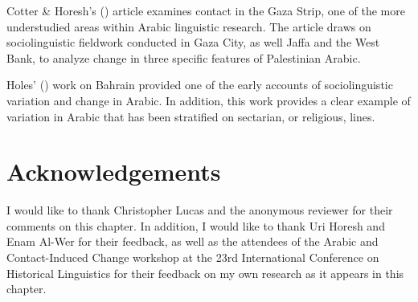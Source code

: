 \documentclass[output=paper]{langsci/langscibook}
\begin{document}
Cotter \& Horesh’s (\citeyear{CotterHoresh2015}) article examines contact in the Gaza Strip, one of the more understudied areas within Arabic linguistic research. The article draws on sociolinguistic fieldwork conducted in Gaza City, as well Jaffa and the West Bank, to analyze change in three specific features of Palestinian Arabic.

Holes' (\citeyear{Holes1987}) work on Bahrain provided one of the early accounts of sociolinguistic variation and change in Arabic. In addition, this work provides a clear example of variation in Arabic that has been stratified on sectarian, or religious, lines. 

\section*{Acknowledgements}

I would like to thank Christopher Lucas and the anonymous reviewer for their comments on this chapter. In addition, I would like to thank Uri Horesh and Enam Al-Wer for their feedback, as well as the attendees of the Arabic and Contact-Induced Change workshop at the 23rd International Conference on Historical Linguistics for their feedback on my own research as it appears in this chapter. 



\sloppy
\printbibliography[heading=subbibliography,notkeyword=this]
\end{document}
